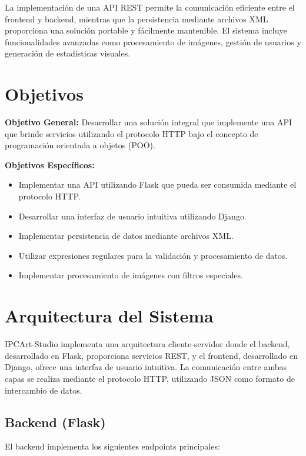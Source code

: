 \documentclass[letterpaper,12pt]{article}
\begin{document}
\begin{multicols}{2}
    La implementación de una API REST permite la comunicación eficiente entre el frontend y backend, mientras que la persistencia mediante archivos XML proporciona una solución portable y fácilmente mantenible. El sistema incluye funcionalidades avanzadas como procesamiento de imágenes, gestión de usuarios y generación de estadísticas visuales.

    \section*{Objetivos}
    \textbf{Objetivo General:}
    Desarrollar una solución integral que implemente una API que brinde servicios utilizando el protocolo HTTP bajo el concepto de programación orientada a objetos (POO).

    \textbf{Objetivos Específicos:}
    \begin{itemize}
        \item Implementar una API utilizando Flask que pueda ser consumida mediante el protocolo HTTP.
        \item Desarrollar una interfaz de usuario intuitiva utilizando Django.
        \item Implementar persistencia de datos mediante archivos XML.
        \item Utilizar expresiones regulares para la validación y procesamiento de datos.
        \item Implementar procesamiento de imágenes con filtros especiales.
    \end{itemize}

    \section*{Arquitectura del Sistema}
    IPCArt-Studio implementa una arquitectura cliente-servidor donde el backend, desarrollado en Flask, proporciona servicios REST, y el frontend, desarrollado en Django, ofrece una interfaz de usuario intuitiva. La comunicación entre ambas capas se realiza mediante el protocolo HTTP, utilizando JSON como formato de intercambio de datos.

    \subsection*{Backend (Flask)}
    El backend implementa los siguientes endpoints principales:


\end{multicols}
\end{document}
